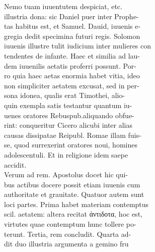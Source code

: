 \documentclass{article}
\begin{document}
\begin{pages}
{                }Nemo tuam iuuentutem despiciat, etc. \\
                illustria dona: sic Daniel puer inter Prophe- \\
                tas habitus est, et Samuel. Dauid, iuuenis e- \\
                gregia dedit specimina futuri regis. Solomon \\
                iuuenis illustre tulit iudicium inter mulieres con \\
                tendentes de infante. Haec et similia ad lau- \\
                dem iuuenilis aetatis proferri possunt. Por- \\
                ro quia haec aetas enormia habet vitia, ideo \\
                non simpliciter aetatem excusat, sed in per- \\
                sona idonea, qualis erat Timothei, alio- \\
                quin exempla satis testantur quantum iu- \\
                uenes oratores Rebuspub.aliquando obfue- \\
                rint: conqueritur Cicero alicubi inter alias \\
                causas dissipatae Reipubl. Romae illam fuis- \\
                se, quod surrexerint oratores noui, homines \\
                adolescentuli. Et in religione idem saepe \\
                accidit. \\
                Verum ad rem. Apostolus docet hic qui- \\
                bus actibus docere possit etiam iuuenis cum \\
                authoritate et grauitate. Quatuor autem sunt \\
                loci partes. Prima habet materiam contemptus \\
                scil. aetatem: altera recitat ἀντιδοτα, hoc est, \\
                virtutes quae contemptum hunc tollere po- \\
                terunt. Tertia, rem concludit. Quarta ad- \\
                dit duo illustria argumenta a gemino fru \\

\end{pages}
\end{document}
